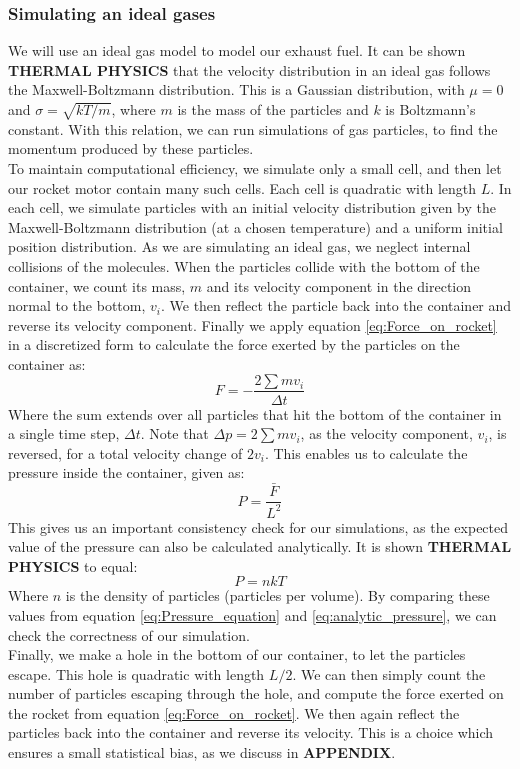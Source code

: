 \documentclass[a4paper,10pt,english]{article}
\begin{document}
\subsubsection{Simulating an ideal gases}
We will use an ideal gas model to model our exhaust fuel. It can be shown \textbf{THERMAL PHYSICS} that the velocity distribution in an ideal gas follows the Maxwell-Boltzmann distribution. This is a Gaussian distribution, with $\mu=0$ and $\sigma=\sqrt{kT/m}$, where $m$ is the mass of the particles and $k$ is Boltzmann's constant. With this relation, we can run simulations of gas particles, to find the momentum produced by these particles.\\
\linebreak
To maintain computational efficiency, we simulate only a small cell, and then let our rocket motor contain many such cells. Each cell is quadratic with length $L$. In each cell, we simulate particles with an initial velocity distribution given by the Maxwell-Boltzmann distribution (at a chosen temperature) and a uniform initial position distribution. As we are simulating an ideal gas, we neglect internal collisions of the molecules. When the particles collide with the bottom of the container, we count its mass, $m$ and its velocity component in the direction normal to the bottom, $v_i$. We then reflect the particle back into the container and reverse its velocity component. Finally we apply equation \ref{eq:Force_on_rocket} in a discretized form to calculate the force exerted by the particles on the container as:
$$F=-\frac{2\sum mv_i}{\Delta t}$$
Where the sum extends over all particles that hit the bottom of the container in a single time step, $\Delta t$. Note that $\Delta p = 2\sum mv_i$, as the velocity component, $v_i$, is reversed, for a total velocity change of $2v_i$. This enables us to calculate the pressure inside the container, given as:
\begin{equation}\label{eq:Pressure_equation}
P=\frac{\bar{F}}{L^2}
\end{equation}
This gives us an important consistency check for our simulations, as the expected value of the pressure can also be calculated analytically. It is shown \textbf{THERMAL PHYSICS} to equal:
\begin{equation}\label{eq:analytic_pressure}
P=nkT
\end{equation}
Where $n$ is the density of particles (particles per volume). By comparing these values from equation \ref{eq:Pressure_equation} and \ref{eq:analytic_pressure}, we can check the correctness of our simulation.\\
\linebreak
Finally, we make a hole in the bottom of our container, to let the particles escape. This hole is quadratic with length $L/2$. We can then simply count the number of particles escaping through the hole, and compute the force exerted on the rocket from equation \ref{eq:Force_on_rocket}. We then again reflect the particles back into the container and reverse its velocity. This is a choice which ensures a small statistical bias, as we discuss in \textbf{APPENDIX}.
\end{document}
